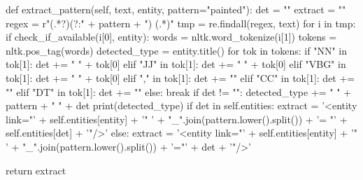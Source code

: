 \documentclass[a4paper]{article}
\begin{document}
\begin{python}
    def extract_pattern(self, text, entity, pattern="painted"):
        det = ""
        extract = ""
        regex = r"(.*?)(?:" + pattern + ") (.*)"
        tmp = re.findall(regex, text)
        for i in tmp:
            if check_if_available(i[0], entity):
                words = nltk.word_tokenize(i[1])
                tokens = nltk.pos_tag(words)
                detected_type = entity.title()
                for tok in tokens:
                    if "NN" in tok[1]:
                        det += " " + tok[0]
                    elif "JJ" in tok[1]:
                        det += " " + tok[0]
                    elif "VBG" in tok[1]:
                        det += " " + tok[0]
                    elif "," in tok[1]:
                        det += ""
                    elif "CC" in tok[1]:
                         det += ""
                    elif "DT" in tok[1]:
                         det += ""
                    else:
                        break
                if det != "":
                    detected_type += " " + pattern + " " + det
                    print(detected_type)
                    if det in self.entities:
                        extract = '<entity link="' + self.entities[entity] + '" ' + "_".join(pattern.lower().split()) + '= "' + self.entities[det] + '"/>'
                    else:
                        extract = '<entity link="' + self.entities[entity] + '" ' + "_".join(pattern.lower().split()) + '="' + det + '"/>'

        return extract

\end{python}
\end{document}
